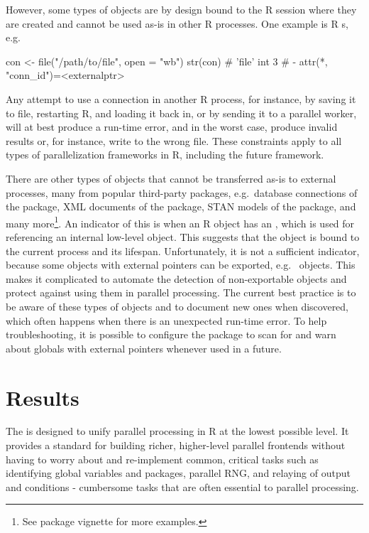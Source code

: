However, some types of objects are by design bound to the R session
where they are created and cannot be used as-is in other R processes.
One example is R s, e.g.
\begin{example}
con <- file("/path/to/file", open = "wb")
str(con)
#  'file' int 3
#  - attr(*, "conn_id")=<externalptr> 
\end{example}
Any attempt to use a connection in another R process, for instance, by
saving it to file, restarting R, and loading it back in, or by sending
it to a parallel worker, will at best produce a run-time error, and in
the worst case, produce invalid results or, for instance, write to the
wrong file.  These constraints apply to all types of parallelization
frameworks in R, including the future framework.

There are other types of objects that cannot be transferred as-is to
external processes, many from popular third-party packages, e.g.\
database connections of the  package, XML documents of
the \CRANpkg{xml2} package, STAN models of the \CRANpkg{stan} package,
and many more\footnote{See \pkg{future} package vignette
 for more examples.}.
An indicator of this is when an R object has an , which is used for referencing an internal low-level
object. This suggests that the object is bound to the current process
and its lifespan.  Unfortunately, it is not a sufficient indicator,
because some objects with external pointers can be exported,
e.g.\  objects.  This makes it complicated to
automate the detection of non-exportable objects and protect against
using them in parallel processing.  The current best practice is to be
aware of these types of objects and to document new ones when
discovered, which often happens when there is an unexpected run-time
error.  To help troubleshooting, it is possible to configure
the  package to scan for and warn about globals with
external pointers whenever used in a future.


\section{Results}
\label{results}

The  is designed to unify parallel processing in R at
the lowest possible level.  It provides a standard for building
richer, higher-level parallel frontends without having to worry about
and re-implement common, critical tasks such as identifying global
variables and packages, parallel RNG, and relaying of output and
conditions - cumbersome tasks that are often essential to parallel
processing.

